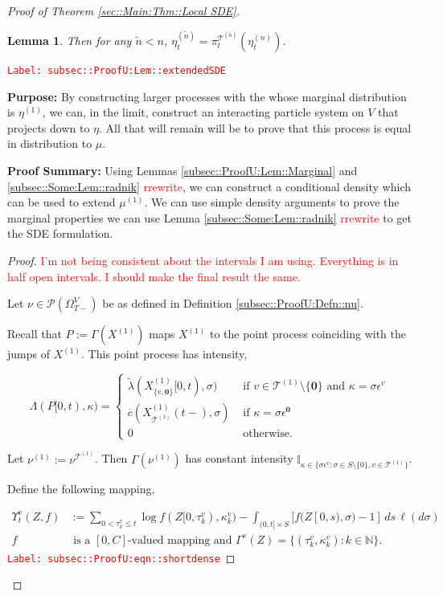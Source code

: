 \documentclass[12pt]{article}
\newcommand{\mb}{\mathbb}
\newcommand{\mc}{\mathcal}
\newcommand{\ov}{\overline}
\newcommand{\te}{\text}
\newcommand{\ep}{\epsilon}
\newcommand{\tr}{\textcolor{red}}
\newcommand{\labe}[1]{\tr{\texttt{Label: #1}}}
\newcommand{\purpose}{\textbf{Purpose: }}
\newcommand{\pfsum}{\textbf{Proof Summary: }}
\newcommand{\ind}{\hspace{24pt}}
\newcommand{\defeq}{:=}								%
\newcommand{\pmsr}{\mc{P}}							%
\renewcommand{\root}{\mathbf{0}}				%
\renewcommand{\v}{v}							%
\renewcommand{\S}{S}							%
\newcommand{\s}{\sigma}							%
\newcommand{\ev}{\ep}							%
\newcommand{\T}{T}								%
\renewcommand{\t}{t}							%
\newcommand{\sset}{\Omega}						%
\newcommand{\proj}{\pi}							%
\renewcommand{\tt}{s}							%
\newcommand{\X}{X}								%
\newcommand{\vind}[1]{^{#1}}					%
\newcommand{\vsi}[1]{^{#1}}						%
\newcommand{\cind}[1]{_{#1}}					%
\newcommand{\tp}[1]{(#1)}						%
\newcommand{\tip}[1]{#1}						%
\newcommand{\ts}[1]{_{#1}}						%
\newcommand{\const}{C}							%
\newcommand{\IGrg}{\ov{c}}						%
\newcommand{\tree}{\mc{T}}						%
\newcommand{\sln}[1]{^{(#1)}}					%
\newcommand{\Sm}{\ell}							%
\newcommand{\alt}[1]{\widetilde{#1}}			%
\newcommand{\indx}[1]{_{#1}}					%
\newcommand{\m}{\mu}							%
\newcommand{\mm}{\nu}							%
\newcommand{\mmm}{\eta}							%
\newcommand{\XXX}{Z}							%
\newcommand{\rt}{\tau}							%
\renewcommand{\it}{k}							%
\newcommand{\pmap}{\Gamma}						%
\renewcommand{\mark}{\kappa}					%
\newcommand{\rp}{P}								%
\newcommand{\ratee}{\Lambda}					%
\newcommand{\crate}{\alt{\lambda}}				%
\newcommand{\ds}{\Upsilon}						%
\newtheorem{lem}[thms]{Lemma}
\begin{document}
\begin{proof}[Proof of Theorem \ref{sec::Main:Thm::Local SDE}]
\begin{lem}
Then for any \(\alt{n} < n\), \(\mmm\sln{\alt{n}}\ts{\t} = \proj\vsi{\tree\sln{\alt{n}}}\ts{\t}(\mmm\sln{n}\ts{\t})\).
\label{subsec::ProofU:Lem::extendedSDE}
\end{lem}
\labe{subsec::ProofU:Lem::extendedSDE}

\purpose By constructing larger processes with the whose marginal distribution is \(\mmm\sln{1}\), we can, in the limit, construct an interacting particle system on \(V\) that projects down to \(\mmm\). All that will remain will be to prove that this process is equal in distribution to \(\m\).

\pfsum Using Lemmas \ref{subsec::ProofU:Lem::Marginal} and \ref{subsec::Some:Lem::radnik} \tr{rrewrite}, we can construct a conditional density which can be used to extend \(\mu\sln{1}\). We can use simple density arguments to prove the marginal properties we can use Lemma \ref{subsec::Some:Lem::radnik} \tr{rrewrite} to get the SDE formulation.

\begin{proof}
\tr{I'm not being consistent about the intervals I am using. Everything is in half open intervals. I should make the final result the same.}

Let \(\mm \in \pmsr(\sset\vsi{V}\ts{\T-})\) be as defined in Definition \ref{subsec::ProofU:Defn::nu}.

\ind Recall that \(\rp \defeq \pmap(\X\sln{1})\) maps \(\X\sln{1}\) to the point process coinciding with the jumps of \(\X\sln{1}\). This point process has intensity,

\[\ratee(\rp[0,\t),\mark) = \begin{cases}
\crate(\X\sln{1}\cind{\{\v,\root\}}\tip{[0,\t)},\s) &\te{ if } \v\in \tree\sln{1}\setminus\{\root\}\te{ and } \mark = \s\ev\vind{\v}\\
\IGrg(\X\sln{1}\cind{\tree\sln{1}}\tp{\t-},\s) &\te{ if } \mark = \s\ev\vind{\root}\\
0 &\te{ otherwise}.
\end{cases}\]

Let \(\mm\sln{1} \defeq \mm\vind{\tree\sln{1}}\). Then \(\pmap(\mm\sln{1})\) has constant intensity \(\mb{I}_{\kappa \in\{\s\ev\vind{\v}:\s\in\S\setminus\{0\},\v\in\tree\sln{1}\}}\). 

\ind Define the following mapping,

\begin{align}
\ds\vind{\v}\ts{\t}(\XXX,f) &\defeq \sum_{0 < \rt\indx{\it}\vind{\v} \leq \t} \log{f(\XXX\tip{[0,\rt\indx{\it}\vind{\v})},\mark\indx{\it}\vind{\v})} - \int_{(0,\t]\times \S} [f(\XXX\tip{[0,\tt)},\s) - 1]\,ds\,\Sm(d\s) \label{subsec::ProofU:eqn::shortdense}\\
f&\te{ is a }[0,\const] \te{-valued mapping and } \pmap\vind{\v}(\XXX) = \{(\rt\indx{\it}\vind{\v},\mark\indx{\it}\vind{\v}):\it\in\mb{N}\}.\nonumber
\end{align} 
\labe{subsec::ProofU:eqn::shortdense}


\end{proof}
\end{proof}
\end{document}

